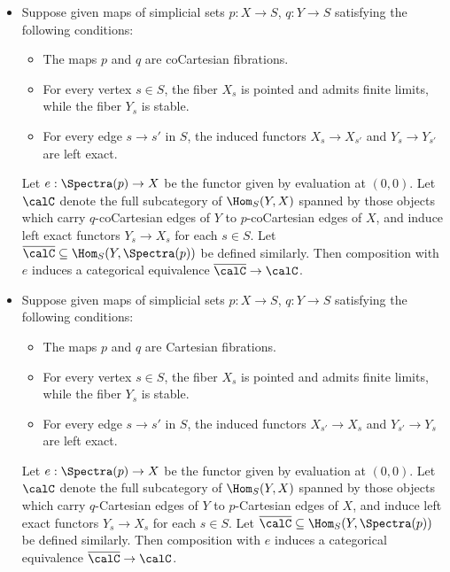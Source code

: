 \begin{proposition}\label{jagger}
\begin{itemize}
\item[$(1)$] Suppose given maps of simplicial sets $p: X \rightarrow S$, $q: Y \rightarrow S$
satisfying the following conditions:
\begin{itemize}
\item[$(a)$] The maps $p$ and $q$ are coCartesian fibrations.
\item[$(b)$] For every vertex $s \in S$, the fiber $X_{s}$ is pointed and admits finite limits, while the fiber $Y_{s}$ is stable.
\item[$(c)$] For every edge $s \rightarrow s'$ in $S$, the induced functors
$X_{s} \rightarrow X_{s'}$ and $Y_{s} \rightarrow Y_{s'}$ are left exact.
\end{itemize}
Let $e: \Spectra(p) \rightarrow X$ be the functor given by evaluation at $(0,0)$.
Let $\calC$ denote the full subcategory of $\Hom_{S}(Y, X)$ spanned by those
objects which carry $q$-coCartesian edges of $Y$ to $p$-coCartesian edges of
$X$, and induce left exact functors $Y_{s} \rightarrow X_{s}$ for each $s \in S$.
Let $\overline{\calC} \subseteq \Hom_{S}( Y, \Spectra(p) )$ be defined similarly.
Then composition with $e$ induces a categorical equivalence $\overline{\calC} \rightarrow \calC$.
\item[$(2)$] Suppose given maps of simplicial sets $p: X \rightarrow S$, $q: Y \rightarrow S$
satisfying the following conditions:
\begin{itemize}
\item[$(a)$] The maps $p$ and $q$ are Cartesian fibrations.
\item[$(b)$] For every vertex $s \in S$, the fiber $X_{s}$ is pointed and admits finite limits, while the fiber $Y_{s}$ is stable.
\item[$(c)$] For every edge $s \rightarrow s'$ in $S$, the induced functors
$X_{s'} \rightarrow X_{s}$ and $Y_{s'} \rightarrow Y_{s}$ are left exact.
\end{itemize}
Let $e: \Spectra(p) \rightarrow X$ be the functor given by evaluation at $(0,0)$.
Let $\calC$ denote the full subcategory of $\Hom_{S}(Y, X)$ spanned by those
objects which carry $q$-Cartesian edges of $Y$ to $p$-Cartesian edges of
$X$, and induce left exact functors $Y_{s} \rightarrow X_{s}$ for each $s \in S$.
Let $\overline{\calC} \subseteq \Hom_{S}( Y, \Spectra(p) )$ be defined similarly.
Then composition with $e$ induces a categorical equivalence $\overline{\calC} \rightarrow \calC$.
\end{itemize}
\end{proposition}

